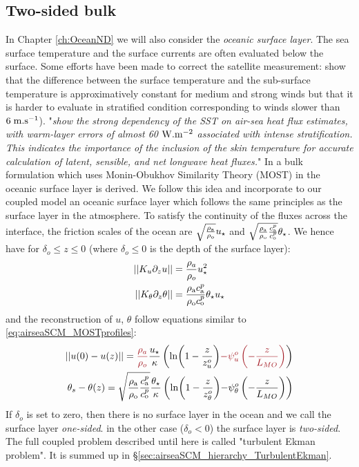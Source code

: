 \subsection{Two-sided bulk}
\label{sec:airseaSCM_twoSided}
In Chapter \ref{ch:OceanND} we will also consider the
\textit{oceanic surface layer}.
The sea surface temperature and the surface currents are often
evaluated below the surface.
Some efforts have been made to correct the satellite
measurement: \citep{donlon_toward_2002} show that
the difference between
the surface temperature and the sub-surface temperature is
approximatively constant for medium and strong winds but that 
it is harder to evaluate in stratified condition corresponding
to winds slower than $6 \; {\rm m}.{\rm s}^{-1}$).
\citep{ward_near-surface_2006}
"\textit{show the strong dependency of the SST on air-sea heat
flux estimates, with warm-layer errors of almost
60 ${\rm W}.{\rm m}^{-2}$ associated with intense stratification. This indicates
the importance of the inclusion of the skin temperature for
accurate calculation of latent, sensible, and net longwave
heat fluxes.}"
In \citep{pelletier_two-sided_2021} a bulk formulation which
uses Monin-Obukhov Similarity Theory (MOST) in the oceanic
surface layer is derived.
We follow this idea and incorporate to our coupled model an
oceanic surface layer which follows the same principles as
the surface layer in the atmosphere.
To satisfy the continuity of the fluxes across the interface,
the friction scales of the ocean are
$\sqrt{\frac{\rho_{\rm a}} {\rho_{\rm o}}} u_\star$ and
$\sqrt{\frac{\rho_{\rm a}}{\rho_{\rm o}}
\frac{c_{\rm a}^p}{c_{\rm o}^p}}
\theta_\star$.
We hence have for $\delta_o \leq z \leq 0$ (where $\delta_o \leq 0$
is the depth of the surface layer):
\begin{equation}
	\begin{aligned}
	||K_u \partial_z u|| &= \frac{\rho_a}{\rho_o}
	u_\star^2\\
	||K_\theta \partial_z \theta|| &=
	\frac{\rho_{\rm a} c_{\rm a}^p}{\rho_{\rm o} c_{\rm o}^p}
	\theta_\star u_\star
	\end{aligned}
\end{equation}
and the reconstruction of $u$, $\theta$ follow equations
similar to \eqref{eq:airseaSCM_MOSTprofiles}:
\begin{equation}
\label{eq:airseaSCM_MOSTprofilesOSL}
\begin{aligned}
	||u(0)-u(z)|| = \emphase{\frac{\rho_a}{\rho_o}}
	\frac{u_\star}{\kappa}
    \left(
	\ln(1-\frac{z}{z_{u}^o})
	\emphase{- \psi_u^o\left(-\frac{z}{L_{MO}}\right)}
    \right)
    \\
	\theta_s - \theta(z) = 
	{\sqrt{\frac{\rho_{\rm a}}{\rho_{\rm o}}
	\frac{c_{\rm a}^p}{c_{\rm o}^p}}}
	\frac{{\theta_\star}}{\kappa}
    \left(
	\ln(1-\frac{z}{z_{\theta}^o})
	{- \psi_\theta^o\left(-\frac{z}{L_{MO}}\right)}
\right)
\end{aligned}
\end{equation}
If $\delta_o$ is set to zero, then there is no surface layer
in the ocean and we call the surface layer \textit{one-sided}.
in the other case ($\delta_o<0$) the surface layer is
\textit{two-sided}.
The full coupled problem described until here
is called "turbulent Ekman problem". It is summed up in
\S\ref{sec:airseaSCM_hierarchy_TurbulentEkman}.
